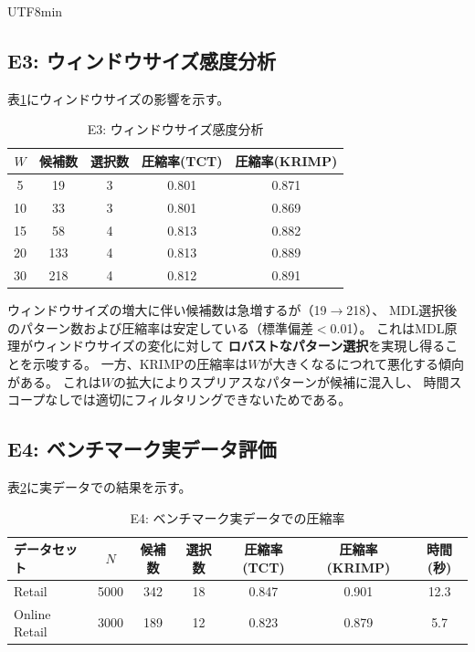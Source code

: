 \documentclass[11pt,a4paper]{article}
\begin{document}
\begin{CJK}{UTF8}{min}
\subsection{E3: ウィンドウサイズ感度分析}

表\ref{tab:e3}にウィンドウサイズの影響を示す。

\begin{table}[t]
\centering
\caption{E3: ウィンドウサイズ感度分析}\label{tab:e3}
\begin{tabular}{ccccc}
\toprule
$W$ & 候補数 & 選択数 & 圧縮率(TCT) & 圧縮率(KRIMP) \\
\midrule
5  & 19  & 3 & 0.801 & 0.871 \\
10 & 33  & 3 & 0.801 & 0.869 \\
15 & 58  & 4 & 0.813 & 0.882 \\
20 & 133 & 4 & 0.813 & 0.889 \\
30 & 218 & 4 & 0.812 & 0.891 \\
\bottomrule
\end{tabular}
\end{table}

ウィンドウサイズの増大に伴い候補数は急増するが（19$\to$218）、
MDL選択後のパターン数および圧縮率は安定している（標準偏差$<$0.01）。
これはMDL原理がウィンドウサイズの変化に対して
\textbf{ロバストなパターン選択}を実現し得ることを示唆する。
一方、KRIMPの圧縮率は$W$が大きくなるにつれて悪化する傾向がある。
これは$W$の拡大によりスプリアスなパターンが候補に混入し、
時間スコープなしでは適切にフィルタリングできないためである。

\subsection{E4: ベンチマーク実データ評価}

表\ref{tab:e4}に実データでの結果を示す。

\begin{table}[t]
\centering
\caption{E4: ベンチマーク実データでの圧縮率}\label{tab:e4}
\begin{tabular}{lcccccc}
\toprule
データセット & $N$ & 候補数 & 選択数 & 圧縮率(TCT) & 圧縮率(KRIMP) & 時間(秒) \\
\midrule
Retail~\cite{brijs2003retail}         & 5000 & 342 & 18 & 0.847 & 0.901 & 12.3 \\
Online Retail~\cite{chen2012online}   & 3000 & 189 & 12 & 0.823 & 0.879 & 5.7 \\
\bottomrule
\end{tabular}
\end{table}


\end{CJK}
\end{document}
